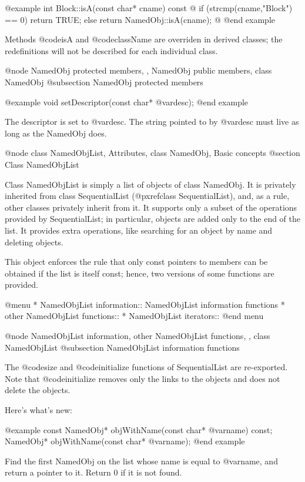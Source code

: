 @example
int Block::isA(const char* cname) const @{
        if (strcmp(cname,"Block") == 0) return TRUE;
        else return NamedObj::isA(cname);
@}
@end example

Methods @code{isA} and @code{className} are overriden in derived
classes; the redefinitions will not be described for each individual
class.

@node NamedObj protected members,  , NamedObj public members, class NamedObj
@subsection NamedObj protected members

@example
void setDescriptor(const char* @var{desc});
@end example

The descriptor is set to @var{desc}.  The string pointed to by
@var{desc} must live as long as the NamedObj does.

@node class NamedObjList, Attributes, class NamedObj, Basic concepts
@section Class NamedObjList

Class NamedObjList is simply a list of objects of class NamedObj.
It is privately inherited from class SequentialList
(@pxref{class SequentialList}), and, as a rule,
other classes privately inherit from it.  It supports only a subset
of the operations provided by SequentialList; in particular, objects
are added only to the end of the list.  It provides extra operations,
like searching for an object by name and deleting objects.

This object enforces the rule that only const pointers to members can
be obtained if the list is itself const; hence, two versions of some
functions are provided.

@menu
* NamedObjList information::  NamedObjList information functions
* other NamedObjList functions::  
* NamedObjList iterators::  
@end menu

@node NamedObjList information, other NamedObjList functions,  , class NamedObjList
@subsection NamedObjList information functions

The @code{size} and @code{initialize} functions of SequentialList
are re-exported.  Note that @code{initialize} removes only the links
to the objects and does not delete the objects.

Here's what's new:

@example
const NamedObj* objWithName(const char* @var{name}) const;
NamedObj* objWithName(const char* @var{name});
@end example

Find the first NamedObj on the list whose name is equal to @var{name},
and return a pointer to it.  Return 0 if it is not found.

